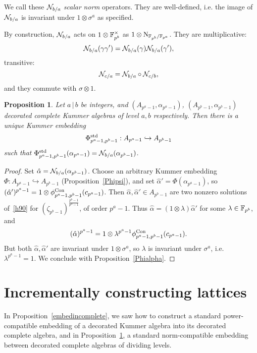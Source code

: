 \documentclass{sig-alternate}
\newtheorem{proposition}[theorem]{Proposition}
\begin{document}
We call these $\mathcal{N}_{b/a}$ \emph{scalar norm} operators.
They are well-defined, i.e. the image of $\mathcal{N}_{b/a}$ is invariant under $1\otimes\sigma^a$ as specified.

By construction, $\mathcal{N}_{b/a}$ acts on $1\otimes\mathbb{F}_{p^b}^\times$ as $1\otimes\operatorname{N}_{\mathbb{F}_{p^b}/\mathbb{F}_{p^a}}$.
They are multiplicative:
\[
  \mathcal{N}_{b/a}(\gamma\gamma')=\mathcal{N}_{b/a}(\gamma)\mathcal{N}_{b/a}(\gamma'),
\]
transitive: \[ \mathcal{N}_{c/a} = \mathcal{N}_{b/a}\circ\mathcal{N}_{c/b},\] and they
commute with $\sigma\otimes1$.
\begin{proposition}
\label{embedcomplete}
Let $a\,|\,b$ be integers,
and $(A_{p^a-1},\alpha_{p^a-1})$, $(A_{p^b-1},\alpha_{p^b-1})$ decorated complete Kummer algebras
of level $a,b$ respectively.
Then there is a unique Kummer embedding
\[ {\Phi^{\textrm{std}}_{{p^a-1},{p^b-1}}}:A_{p^a-1}\hookrightarrow A_{p^b-1} \]
such that ${\Phi^{\textrm{std}}_{{p^a-1},{p^b-1}}}(\alpha_{p^a-1})=\mathcal{N}_{b/a}(\alpha_{p^b-1})$.
\end{proposition}
\begin{proof}
Set $\hat\alpha=\mathcal{N}_{b/a}(\alpha_{p^b-1})$.
Choose an arbitrary Kummer embedding $\Phi:A_{p^a-1}\hookrightarrow A_{p^b-1}$ (Proposition~\ref{Phipsi}),
and set $\hat\alpha'=\Phi(\alpha_{p^a-1})$, so $(\hat\alpha')^{p^a-1}=1\otimes{\phi^{\textrm{Con}}_{{p^a-1},{p^b-1}}}(c_{p^a-1})$.
Then $\hat\alpha,\hat\alpha'\in A_{p^b-1}$ are two nonzero solutions of~\eqref{h90}
for $(\zeta_{p^b-1})^{\frac{p^b-1}{p^a-1}}$, of order $p^a-1$.
Thus $\hat\alpha=(1\otimes\lambda)\hat\alpha'$ for some $\lambda\in\mathbb{F}_{p^b}$,
and \[ (\hat\alpha)^{p^a-1}=1\otimes\lambda^{p^a-1}{\phi^{\textrm{Con}}_{{p^a-1},{p^b-1}}}(c_{p^a-1}). \]
But both $\hat\alpha,\hat\alpha'$ are invariant under $1\otimes\sigma^a$, so $\lambda$ is invariant under $\sigma^a$,
i.e. $\lambda^{p^a-1}=1$.
We conclude with Proposition~\ref{Phialpha}.
\end{proof}



\section{Incrementally constructing lattices}
\label{sec:construction}

In Proposition~\ref{embedincomplete}, we saw how to construct a standard
power-compatible embedding of a decorated Kummer algebra into
its decorated complete algebra,
and in Proposition~\ref{embedcomplete}, a standard
norm-compatible embedding between decorated complete algebras
of dividing levels.
 
\end{document}
